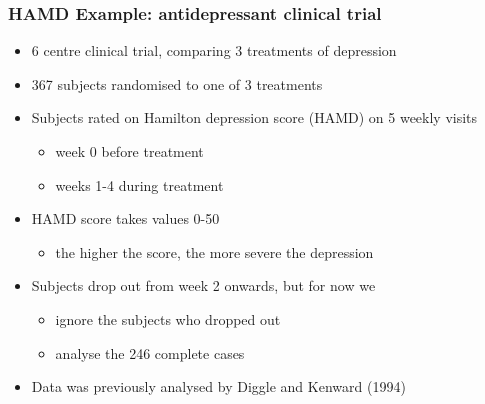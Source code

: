 \documentclass{beamer}
\begin{document}
\begin{frame}
    \frametitle{HAMD Example: antidepressant clinical trial}
    \begin{itemize}
       \item 6 centre clinical trial, comparing 3 treatments of depression\vspace{2mm}
       \item 367 subjects randomised to one of 3 treatments\vspace{2mm}
       \item Subjects rated on Hamilton depression score (HAMD) on 5 weekly visits\vspace{1mm}
       \begin{itemize}
            \item week 0 before treatment\vspace{1mm}
            \item weeks 1-4 during treatment\vspace{2mm}
       \end{itemize}
       \item HAMD score takes values 0-50\vspace{1mm}
       \begin{itemize}
            \item the higher the score, the more severe the depression\vspace{2mm}
       \end{itemize}
       \item Subjects drop out from week 2 onwards, but for now we\vspace{1mm}
       \begin{itemize}
            \item ignore the subjects who dropped out\vspace{1mm}
            \item analyse the 246 complete cases\vspace{2mm}
       \end{itemize}
       \item Data was previously analysed by Diggle and Kenward (1994)
    \end{itemize}
\end{frame}
\end{document}

